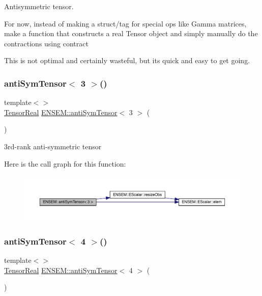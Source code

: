 Antisymmetric tensor. 

For now, instead of making a struct/tag for special ops like Gamma matrices, make a function that constructs a real Tensor object and simply manually do the contractions using contract

This is not optimal and certainly wasteful, but its quick and easy to get going. \mbox{\label{namespaceENSEM_a4ce86ea9e03a33e62daa145e7832fa29}} 
\subsubsection{\texorpdfstring{antiSymTensor$<$ 3 $>$()}{antiSymTensor< 3 >()}}
{\footnotesize\ttfamily template$<$$>$ \\
\mbox{\hyperlink{group__defs_ga958dd8b23f0fe048624bd04c42201408}{Tensor\+Real}} \mbox{\hyperlink{namespaceENSEM_aee2482527c2e020e327d542d07e92dee}{E\+N\+S\+E\+M\+::anti\+Sym\+Tensor}}$<$ 3 $>$ (\begin{DoxyParamCaption}{ }\end{DoxyParamCaption})\hspace{0.3cm}{\ttfamily [inline]}}



3rd-\/rank anti-\/symmetric tensor 

Here is the call graph for this function\+:\nopagebreak
\begin{figure}[H]
\begin{center}
\leavevmode
\includegraphics[width=350pt]{d2/d94/namespaceENSEM_a4ce86ea9e03a33e62daa145e7832fa29_cgraph}
\end{center}
\end{figure}
\mbox{\label{namespaceENSEM_a6065b3f3c5f3e116256e3897ce3ca1d5}} 
\subsubsection{\texorpdfstring{antiSymTensor$<$ 4 $>$()}{antiSymTensor< 4 >()}}
{\footnotesize\ttfamily template$<$$>$ \\
\mbox{\hyperlink{group__defs_ga958dd8b23f0fe048624bd04c42201408}{Tensor\+Real}} \mbox{\hyperlink{namespaceENSEM_aee2482527c2e020e327d542d07e92dee}{E\+N\+S\+E\+M\+::anti\+Sym\+Tensor}}$<$ 4 $>$ (\begin{DoxyParamCaption}{ }\end{DoxyParamCaption})\hspace{0.3cm}{\ttfamily [inline]}}



